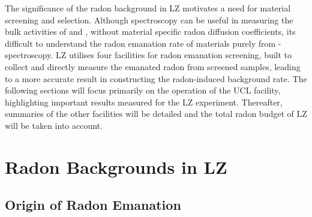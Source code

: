 The significance of the radon background in LZ motivates a need for material screening and selection. Although \gray{} spectroscopy can be useful in measuring the bulk activities of \UandTe{} and \UandTl{}, without material specific radon diffusion coefficients, its difficult to understand the radon emanation rate of materials purely from \gamma-spectroscopy. LZ utilises four facilities for radon emanation screening, built to collect and directly measure the emanated radon from screened samples, leading to a more accurate result in constructing the radon-induced background rate. The following sections will focus primarily on the operation of the UCL facility, highlighting important results measured for the LZ experiment. Thereafter, summaries of the other facilities will be detailed and the total radon budget of LZ will be taken into account. 

\section{Radon Backgrounds in LZ}
\label{sec:radon_and_lz}

\subsection{Origin of Radon Emanation}
\label{secsec:radon_origins}

